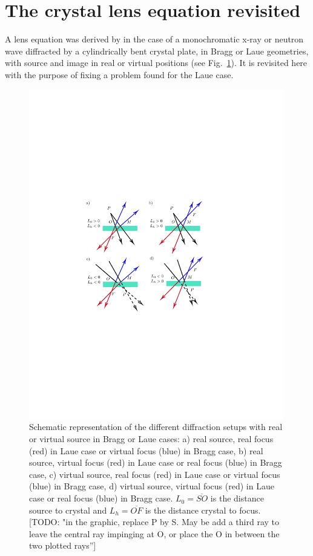 \documentclass[preprint]{iucr}              %
\newcommand{\todo}[1]{{\color{red}[TODO: "#1'']}}
\newcommand{\inred}[1]{{\color{red}#1}}
\begin{document}
\section{The crystal lens equation revisited}
\label{sec:CLE}

A lens equation was derived by \cite{CK} \inred{in} the case of a monochromatic x-ray or neutron wave diffracted by a cylindrically bent crystal plate, \inred{in} Bragg \inred{or} Laue geometries, with source and image in real or virtual positions (see Fig.~\ref{fig:geometries}). \inred{It is revisited here with the purpose of} fixing a problem found for the Laue case.

\begin{figure}
\label{fig:geometries}
\caption{Schematic representation of the different diffraction setups with real or virtual source in Bragg or Laue \inred{cases}:
a) real source, real focus (red) in Laue case \inred{or} virtual focus (blue) in Bragg case,
b) real source, virtual focus (red) in Laue case \inred{or} real focus (blue) in Bragg case,
c) virtual source, real focus (red) in Laue case \inred{or} virtual focus (blue) in Bragg case,  
d) virtual source, virtual focus (red) in Laue case \inred{or} real focus (blue) in Bragg case.
\inred{$L_0=\overline{SO}$ is the distance source to crystal and $L_h=\overline{OF}$ is the distance crystal to focus.}
\todo{in the graphic, replace P by S. May be add a third ray to leave the central ray impinging at O, or place the O in between the two plotted rays}
}
\includegraphics[width=0.99\textwidth,trim=4cm 9cm 6cm 9cm,clip=true]{fig1.pdf}
\end{figure}
\end{document}
